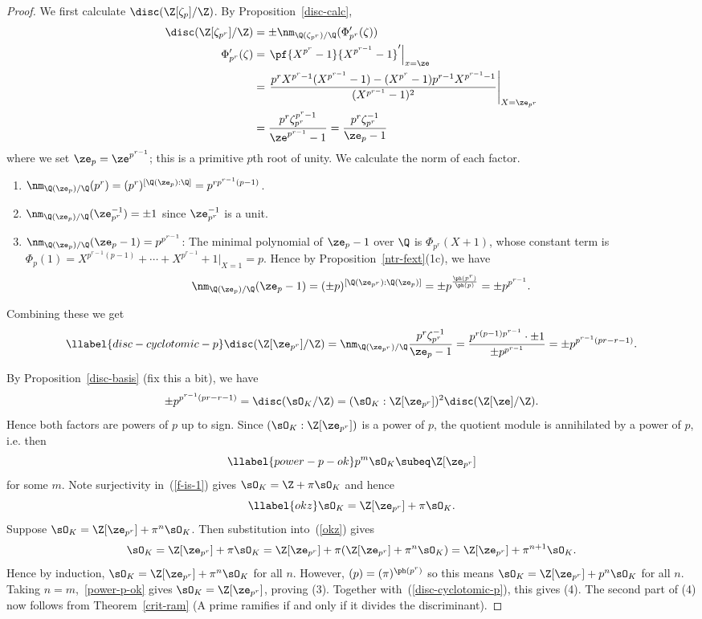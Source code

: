 \begin{proof}
We first calculate $\disc(\Z[\zeta_p]/\Z)$. By Proposition~\ref{disc-calc},
\begin{align*}
\disc(\Z[\zeta_{p^r}]/\Z)&=\pm \nm_{\Q(\zeta_{p^r})/\Q} (\Phi'_{p^r}(\zeta))\\
\Phi'_{p^r}(\zeta)
&=\left.\pf{X^{p^r}-1}{X^{p^{r-1}}-1}'\right|_{x=\ze}\\
&=\left.\frac
{p^rX^{p^r-1}(X^{p^{r-1}}-1)-(X^{p^r}-1)p^{r-1}X^{p^{r-1}-1}}
{(X^{p^{r-1}}-1)^2}\right|_{X=\ze_{p^r}}\\
&=\frac{p^r\zeta_{p^r}^{p^r-1}}{\ze^{p^{r-1}}-1}
=\frac{p^r\zeta_{p^r}^{-1}}{\ze_p-1}
\end{align*}
where we set $\ze_p=\ze^{p^{r-1}}$; this is a primitive $p$th root of unity. We calculate the norm of each factor.
\begin{enumerate}
\item $\nm_{\Q(\ze_p)/\Q}(p^r)=(p^r)^{[\Q(\ze_p):\Q]}=p^{rp^{r-1}(p-1)}$.
\item $\nm_{\Q(\ze_p)/\Q}(\ze_{p^r}^{-1})=\pm 1$ since $\ze_{p^r}^{-1}$ is a unit.
\item $\nm_{\Q(\ze_p)/\Q}(\ze_p-1)=p^{p^{r-1}}$: The minimal polynomial of $\ze_p-1$ over $\Q$ is 
$\Phi_{p^r}(X+1)$, whose constant term is $\Phi_{p}(1)=X^{p^{r-1}(p-1)}+\cdots +X^{p^{r-1}}+1|_{X=1}=p$. Hence by Proposition~\ref{ntr-fext}(1c), we have
\[
\nm_{\Q(\ze_p)/\Q}(\ze_p-1)=(\pm p)^{[\Q(\ze_{p^r}):\Q(\ze_p)]}
=\pm p^{\frac{\ph(p^r)}{\ph(p)}}=\pm p^{p^{r-1}}.
\]
\end{enumerate}
Combining these we get
\begin{equation}\llabel{disc-cyclotomic-p}
\disc(\Z[\ze_{p^r}]/\Z)=\nm_{\Q(\ze_{p^r})/\Q}\frac{p^r \zeta_{p^r}^{-1}}{\ze_p-1}=\frac{p^{r(p-1)p^{r-1}}\cdot \pm1}{\pm p^{p^{r-1}}}=\pm p^{p^{r-1}(pr-r-1)}.
\end{equation}

By Proposition~\ref{disc-basis} (fix this a bit), we have
\[
\pm p^{p^{r-1}(pr-r-1)}=\disc(\sO_K/\Z)=(\sO_K:\Z[\ze_{p^r}])^2\disc(\Z[\ze]/\Z).
\]
Hence both factors are powers of $p$ up to sign. Since $(\sO_K:\Z[\ze_{p^r}])$ is a power of $p$, the quotient module is annihilated by a power of $p$, i.e. then 
\begin{equation}\llabel{power-p-ok}
p^m\sO_K\subeq \Z[\ze_{p^r}]
\end{equation}
for some $m$.  Note surjectivity in~(\ref{f-is-1}) gives $\sO_K=\Z+\pi\sO_K$ and hence
\begin{equation}\llabel{okz}
\sO_K=\Z[\ze_{p^r}]+\pi\sO_K.
\end{equation}
Suppose $\sO_K=\Z[\ze_{p^r}]+\pi^n\sO_K$. Then substitution into~(\ref{okz}) gives
\[
\sO_K=\Z[\ze_{p^r}]+\pi\sO_K=\Z[\ze_{p^r}]+\pi(\Z[\ze_{p^r}]+\pi^n\sO_K) =\Z[\ze_{p^r}]+\pi^{n+1}\sO_K.
\]
Hence by induction, $\sO_K=\Z[\ze_{p^r}]+\pi^n\sO_K$ for all $n$. However, $(p)=(\pi)^{\ph(p^r)}$ so this means $\sO_K=\Z[\ze_{p^r}]+p^n\sO_K$ for all $n$. Taking $n=m$,~\eqref{power-p-ok} gives $\sO_K=\Z[\ze_{p^r}]$, proving (3). Together with~(\ref{disc-cyclotomic-p}), this gives (4). The second part of (4) now follows from Theorem~\ref{crit-ram} (A prime ramifies if and only if it divides the discriminant).


\end{proof}
